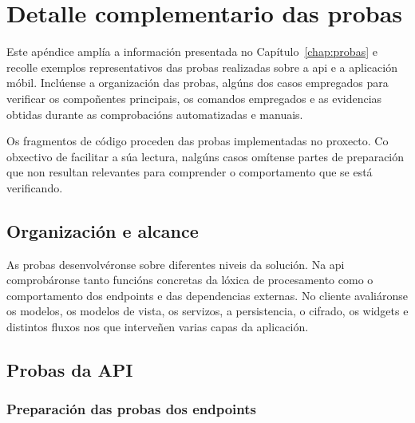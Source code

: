 \chapter{Detalle complementario das probas}
\label{app:probas-complementarias}
\lstset{
    captionpos=t
}
Este apéndice amplía a información presentada no Capítulo~\ref{chap:probas} e recolle exemplos representativos das probas realizadas sobre a \gls{api} e a aplicación móbil. Inclúense a organización das probas, algúns dos casos empregados para verificar os compoñentes principais, os comandos empregados e as evidencias obtidas durante as comprobacións automatizadas e manuais.

Os fragmentos de código proceden das probas implementadas no proxecto. Co obxectivo de facilitar a súa lectura, nalgúns casos omítense partes de preparación que non resultan relevantes para comprender o comportamento que se está verificando.


\section{Organización e alcance}

As probas desenvolvéronse sobre diferentes niveis da solución. Na \gls{api} comprobáronse tanto funcións concretas da lóxica de procesamento como o comportamento dos endpoints e das dependencias externas. No cliente avaliáronse os modelos, os modelos de vista, os servizos, a persistencia, o cifrado, os widgets e distintos fluxos nos que interveñen varias capas da aplicación.


\section{Probas da API}

\subsection{Preparación das probas dos endpoints}


